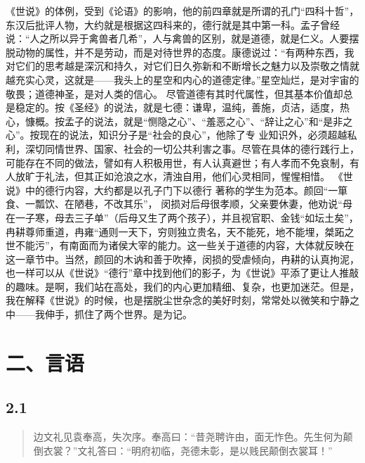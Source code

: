 \documentclass[]{book}
\begin{document}
《世说》的体例，受到《论语》的影响，他的前四章就是所谓的孔门``四科十哲''，东汉后批评人物，大约就是根据这四科来的，德行就是其中第一科。孟子曾经说：``人之所以异于禽兽者几希''，人与禽兽的区别，就是道德，就是仁义。人要摆脱动物的属性，并不是劳动，而是对待世界的态度。康德说过：``有两种东西，我对它们的思考越是深沉和持久，对它们日久弥新和不断增长之魅力以及崇敬之情就越充实心灵，这就是------我头上的星空和内心的道德定律。''星空灿烂，是对宇宙的敬畏；道德神圣，是对人类的信心。
尽管道德有其时代属性，但其基本价值却总是稳定的。按《圣经》的说法，就是七德：谦卑，温纯，善施，贞洁，适度，热心，慷概。按孟子的说法，就是``恻隐之心''、``羞恶之心''、``辞让之心''和``是非之心''。按现在的说法，知识分子是``社会的良心''，他除了专
业知识外，必须超越私利，深切同情世界、国家、社会的一切公共利害之事。尽管在具体的德行践行上，可能存在不同的做法，譬如有人积极用世，有人认真避世；有人孝而不免哀制，有人放旷于礼法，但其正如沧浪之水，清浊自用，他们心灵相同，惺惺相惜。
《世说》中的德行内容，大约都是以孔子门下以德行
著称的学生为范本。颜回``一箪食、一瓢饮、在陋巷，不改其乐''，
闵损对后母很孝顺，父亲要休妻，他劝说``母在一子寒，母去三子单''（后母又生了两个孩子），并且视官职、金钱``如坛土矣''，
冉耕尊师重道，冉雍``通则一天下，穷则独立贵名，天不能死，地不能埋，桀跖之世不能污''，有南面而为诸侯大宰的能力。这一些关于道德的内容，大体就反映在这一章节中。当然，颜回的木讷和善于吹捧，闵损的受虐倾向，冉耕的认真拘泥，也一样可以从《世说》``德行''章中找到他们的影子，为《世说》平添了更让人推敲的趣味。是啊，我们站在高处，我们的内心更加精细、复杂，也更加迷茫。但是，我在解释《世说》的时候，也是摆脱尘世杂念的美好时刻，常常处以微笑和宁静之中------我伸手，抓住了两个世界。是为记。

\chapter{二、言语}

\section{2.1}\label{section-47}

\begin{quote}
边文礼见袁奉高，失次序。奉高曰：``昔尧聘许由，面无怍色。先生何为颠倒衣裳？''文礼答曰：``明府初临，尧德未彰，是以贱民颠倒衣裳耳！''
\end{quote}
\end{document}
